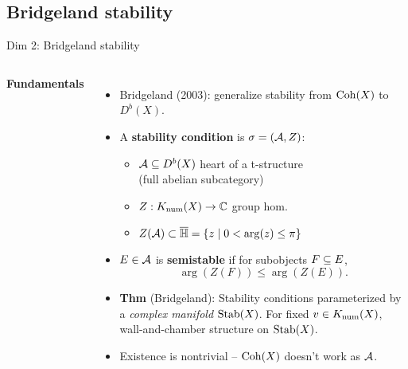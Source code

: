 \documentclass[8pt]{beamer} %
\begin{document}
\subsection{Bridgeland stability}
\begin{frame}{Dim 2: Bridgeland stability}
    \begin{columns}[t]
        \textbf{Fundamentals}
        \begin{itemize}
            \item<2-> Bridgeland (2003): generalize stability from $\mathrm{Coh}(X)$ to $D^b(X)$.
            \item<3-> A \textbf{stability condition} is $\sigma = (\mathcal{A}, Z)$:
            \begin{itemize}
                \item<4-> $\mathcal{A} \subseteq D^b(X)$ heart of a t-structure \\
                \qquad\qquad (full abelian subcategory)
                \item<5-> $Z: K_{\mathrm{num}}(X) \to \mathbb{C}$ group hom.
                \item<6-> $Z(\mathcal{A}) \subset \overline{\mathbb{H}} = \{ z \;|\; 0 < \arg(z) \le \pi \}$
            \end{itemize}
            \item<7-> $E \in \mathcal{A}$ is \textbf{semistable} if for subobjects $F \subseteq E$,
            \[ \arg(Z(F)) \le \arg(Z(E)). \]
            \item<8-> \textbf{Thm} (Bridgeland): Stability conditions parameterized by a \textit{complex manifold} $\operatorname{\mathrm{Stab}}(X)$. For fixed $v \in K_{\mathrm{num}}(X)$, wall-and-chamber structure on $\operatorname{\mathrm{Stab}}(X)$.
            \item<9-> Existence is nontrivial -- $\mathrm{Coh}(X)$ doesn't work as $\mathcal{A}$.
        \end{itemize}
        

\end{columns}
\end{frame}
\end{document}
